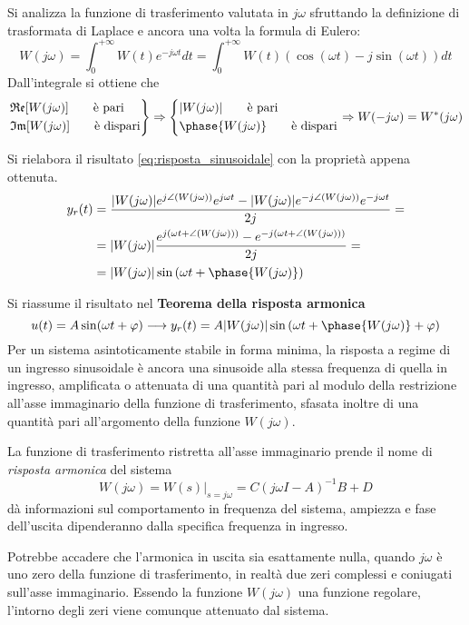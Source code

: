 Si analizza la funzione di trasferimento valutata in $j\omega$ sfruttando la
definizione di trasformata di Laplace e ancora una volta la formula di Eulero:
$$
W(j\omega) = \int_0^{+\infty} W(t) e^{-j\omega t} dt = \int_0^{+\infty} W(t)
\left(\cos(\omega t) - j\sin(\omega t) \right)dt
$$
Dall'integrale si ottiene che
$$\left.\begin{aligned}
&\Re[W(j\omega)] \qquad \text{è pari}\\
&\Im[W(j\omega)] \qquad \text{è dispari}
\end{aligned}\right\}
\Rightarrow\left\{\begin{aligned}
&|W(j\omega)| \qquad \text{è pari} \\
&\phase{W(j\omega)}\qquad \text{è dispari}
\end{aligned}\right. \Rightarrow
W(-j\omega) = W^*(j\omega)
$$

Si rielabora il risultato \ref{eq:risposta_sinusoidale} con la proprietà appena
ottenuta.
$$\begin{aligned}
y_r(t) &= \frac{|W(j\omega)|e^{j\angle{(W(j\omega))}}e^{j\omega t}
- |W(j\omega)|e^{-j\angle({W(j\omega)})}e^{-j\omega t}  }
{2j} =\\
&=
|W(j\omega)|\frac{e^{j(\omega t + \angle(W(j\omega)))} - e^{-j(\omega t +
\angle(W(j\omega)))}}
{2j} = \\
&= |W(j\omega)|\sin\left(\omega t + \phase{W(j\omega)}\right)
\end{aligned}$$

Si riassume il risultato nel \textbf{Teorema della risposta armonica}
$$
u(t) = A\sin(\omega t + \varphi) \longrightarrow y_r(t) =
A|W(j\omega)|\sin\left( \omega t + \phase{W(j\omega)} + \varphi \right)
$$
Per un sistema asintoticamente stabile in forma minima, la risposta a regime di
un ingresso sinusoidale è ancora una sinusoide alla stessa frequenza di quella
in ingresso, amplificata o attenuata di una quantità pari al modulo della
restrizione all'asse immaginario della funzione di trasferimento, sfasata
inoltre di una quantità pari all'argomento della funzione $W(j\omega)$.

La funzione di trasferimento ristretta all'asse immaginario prende il nome di
\textit{risposta armonica} del sistema
$$
W(j\omega) = \left.W(s)\right|_{s=j\omega} = C(j\omega I-A)^{-1}B + D
$$
dà informazioni sul comportamento in frequenza del sistema, ampiezza e fase
dell'uscita dipenderanno dalla specifica frequenza in ingresso.

Potrebbe accadere che l'armonica in uscita sia esattamente nulla, quando
$j\omega$ è uno zero della funzione di trasferimento, in realtà due zeri
complessi e coniugati sull'asse immaginario.
Essendo la funzione $W(j\omega)$ una funzione regolare, l'intorno degli zeri
viene comunque attenuato dal sistema.

